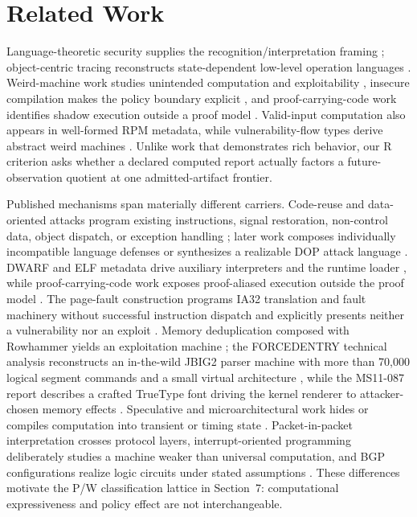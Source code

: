 \documentclass[conference]{IEEEtran}
\begin{document}
\section{Related Work}

Language-theoretic security supplies the recognition/interpretation framing \cite{ref1,ref2,ref3,ref4}; object-centric tracing reconstructs state-dependent low-level operation languages \cite{ref10}. Weird-machine work studies unintended computation and exploitability \cite{ref11,ref14}, insecure compilation makes the policy boundary explicit \cite{ref15}, and proof-carrying-code work identifies shadow execution outside a proof model \cite{ref16}. Valid-input computation also appears in well-formed RPM metadata, while vulnerability-flow types derive abstract weird machines \cite{ref27,ref28}. Unlike work that demonstrates rich behavior, our R criterion asks whether a declared computed report actually factors a future-observation quotient at one admitted-artifact frontier.

Published mechanisms span materially different carriers. Code-reuse and data-oriented attacks program existing instructions, signal restoration, non-control data, object dispatch, or exception handling \cite{ref39,ref40,ref41,ref42,ref43}; later work composes individually incompatible language defenses or synthesizes a realizable DOP attack language \cite{ref56,ref57}. DWARF and ELF metadata drive auxiliary interpreters and the runtime loader \cite{ref44,ref45}, while proof-carrying-code work exposes proof-aliased execution outside the proof model \cite{ref16}. The page-fault construction programs IA32 translation and fault machinery without successful instruction dispatch and explicitly presents neither a vulnerability nor an exploit \cite{ref46}. Memory deduplication composed with Rowhammer yields an exploitation machine \cite{ref47}; the FORCEDENTRY technical analysis reconstructs an in-the-wild JBIG2 parser machine with more than 70,000 logical segment commands and a small virtual architecture \cite{ref55}, while the MS11-087 report describes a crafted TrueType font driving the kernel renderer to attacker-chosen memory effects \cite{ref58}. Speculative and microarchitectural work hides or compiles computation into transient or timing state \cite{ref48,ref49,ref50}. Packet-in-packet interpretation crosses protocol layers, interrupt-oriented programming deliberately studies a machine weaker than universal computation, and BGP configurations realize logic circuits under stated assumptions \cite{ref51,ref52,ref53}. These differences motivate the P/W classification lattice in Section~7: computational expressiveness and policy effect are not interchangeable.
\end{document}
